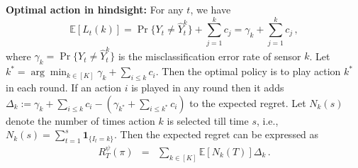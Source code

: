 \noindent
{\bf Optimal action in hindsight: } For any $t$, we have 
\begin{equation}
\label{eqn:OptimalAction}
\mathbb{E}[L_t(k)]=\Pr\{Y_t\neq \hat{Y}^k_t\}+\sum_{j=1}^kc_j=\gamma_k +\sum_{j=1}^k c_j\,,
\end{equation}
where $\gamma_k=\Pr\{Y_t\neq \hat{Y}^k_t\}$ is the misclassification error rate of sensor $k$.
Let $k^*=\arg\min_{k\in [K]} \gamma_k + \sum_{i\le  k}c_i$. 
Then the optimal policy is to play action $k^*$ in each round. 
If an action $i$ is played in any round then it adds $\Delta_k:=\gamma_k + \sum_{i\le k}c_i -( \gamma_{k^*} + \sum_{i\le k^*}c_i)$ to the expected regret. 
Let $N_k(s)$ denote the number of times action $k$ 
is selected till time $s$, i.e., $N_k(s)=\sum_{t=1}^s \boldsymbol{1}_{\{I_t=k\}}$. 
Then the expected regret can be expressed as 
\begin{eqnarray}
\label{eqn:ExpRegretGap}
R^\psi_T(\pi)&=& \sum_{k \in [K]}\mathbb{E}[N_k(T)]\Delta_k\,.
\end{eqnarray}\

